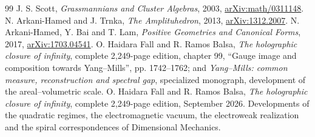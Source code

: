 \documentclass[a4paper,10pt]{article}
\theoremstyle{definition}\newtheorem{definition}[theorem]{Definition}
\theoremstyle{remark}\newtheorem{remark}[theorem]{Remark}
\numberwithin{equation}{section}
\begin{document}
\begin{thebibliography}{99}
 J. S. Scott,
\emph{Grassmannians and Cluster Algebras}, 2003,
\href{https://arxiv.org/abs/math/0311148}{arXiv:math/0311148}.
 N. Arkani-Hamed and J. Trnka,
\emph{The Amplituhedron}, 2013,
\href{https://arxiv.org/abs/1312.2007}{arXiv:1312.2007}.
 N. Arkani-Hamed, Y. Bai and T. Lam,
\emph{Positive Geometries and Canonical Forms}, 2017,
\href{https://arxiv.org/abs/1703.04541}{arXiv:1703.04541}.
 O. Haidara Fall and R. Ramos Balsa,
\emph{The holographic closure of infinity}, complete 2,249-page edition,
chapter 99, ``Gauge image and composition towards Yang--Mills'', pp. 1742--1762;
and \emph{Yang--Mills: common measure, reconstruction and spectral gap},
specialized monograph, development of the areal--volumetric scale.
 O. Haidara Fall and R. Ramos Balsa,
\emph{The holographic closure of infinity}, complete 2,249-page edition,
September 2026. Developments of the quadratic regimes, the electromagnetic
vacuum, the electroweak realization and the spiral
correspondences of Dimensional Mechanics.

\end{thebibliography}
\end{document}
